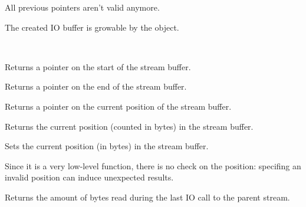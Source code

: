
All previous pointers aren't valid anymore.


The created IO buffer is growable by the object.


\\

\label{wxstreambuffergetbufferstart}


Returns a pointer on the start of the stream buffer.

\label{wxstreambuffergetbufferend}


Returns a pointer on the end of the stream buffer.

\label{wxstreambuffergetbufferpos}


Returns a pointer on the current position of the stream buffer.

\label{wxstreambuffergetintposition}


Returns the current position (counted in bytes) in the stream buffer.

\label{wxstreambuffersetintposition}


Sets the current position (in bytes) in the stream buffer.


Since it is a very low-level function, there is no check on the position:
specifing an invalid position can induce unexpected results.

\label{wxstreambuffergetlastaccess}


Returns the amount of bytes read during the last IO call to the parent stream.

